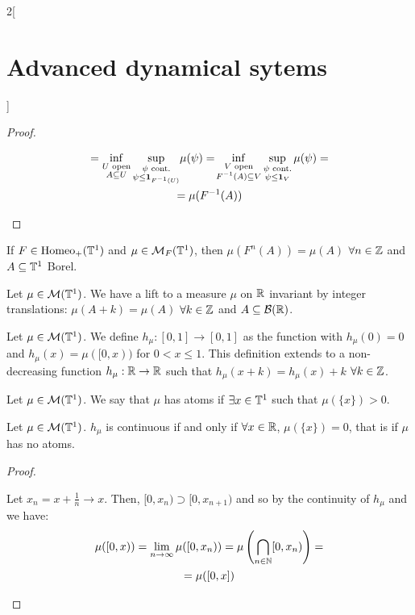 \documentclass[../../../main_math.tex]{subfiles}
\begin{document}
\begin{multicols}{2}[\section{Advanced dynamical sytems}]
\begin{proof}
\begin{itemizeiff}
\begin{multline*}
        =\inf_{\substack{U\text{ open} \\A\subseteq U}}\sup_{\substack{\psi\text{ cont.}\\\psi\leq \boldsymbol{\mathrm{1}}_{F^{-1}(U)}}}\!\mu(\psi)=\!\inf_{\substack{V\text{ open} \\F^{-1}(A)\subseteq V}}\sup_{\substack{\psi\text{ cont.}\\\psi\leq \boldsymbol{\mathrm{1}}_{V}}}\mu(\psi)=\\=\mu(F^{-1}(A))
      \end{multline*}
    \end{itemizeiff}
  \end{proof}
  \begin{remark}
    If $F\in \mathrm{Homeo}_+(\mathbb{T}^1)$ and $\mu\in\mathcal{M}_F(\mathbb{T}^1)$, then $\mu(F^n(A))=\mu(A)$ $\forall n\in\mathbb{Z}$ and $A\subseteq \mathbb{T}^1$ Borel.
  \end{remark}
  \begin{lemma}
    Let $\mu\in \mathcal{M}(\mathbb{T}^1)$. We have a lift to a measure $\mu$ on $\mathbb{R}$ invariant by integer translations: $\mu(A+k)=\mu(A)$ $\forall k\in\mathbb{Z}$ and $A\subseteq \mathcal{B}(\mathbb{R})$.
  \end{lemma}
  \begin{definition}
    Let $\mu\in\mathcal{M}(\mathbb{T}^1)$. We define $h_\mu:[0,1]\to [0,1]$ as the function with $h_\mu(0)=0$ and $h_\mu(x)=\mu([0,x))$ for $0<x\leq 1$. This definition extends to a non-decreasing function $h_\mu:\mathbb{R}\to\mathbb{R}$ such that $h_\mu(x+k)=h_\mu(x)+k$ $\forall k\in\mathbb{Z}$.
  \end{definition}
  \begin{definition}
    Let $\mu\in\mathcal{M}(\mathbb{T}^1)$. We say that $\mu$ has atoms if $\exists x\in\mathbb{T}^1$ such that $\mu(\{x\})>0$.
  \end{definition}
  \begin{lemma}\label{ADS:lemma_atom}
    Let $\mu\in\mathcal{M}(\mathbb{T}^1)$. $h_\mu$ is continuous if and only if $\forall x\in\mathbb{R}$, $\mu(\{x\})=0$, that is if $\mu$ has no atoms.
  \end{lemma}
  \begin{proof}
    \begin{itemizeiff}
      Let $x_n=x+\frac{1}{n}\to x$. Then, $[0,x_n)\supset [0,x_{n+1})$ and so by the continuity of $h_\mu$ and  we have:
      \begin{multline*}
        \mu([0,x))=\lim_{n\to\infty}\mu([0,x_n))=\mu\left(\bigcap_{n\in\NN}[0,x_n)\right)=\\=\mu([0,x])

\end{multline*}
\end{itemizeiff}
\end{proof}
\end{multicols}
\end{document}
